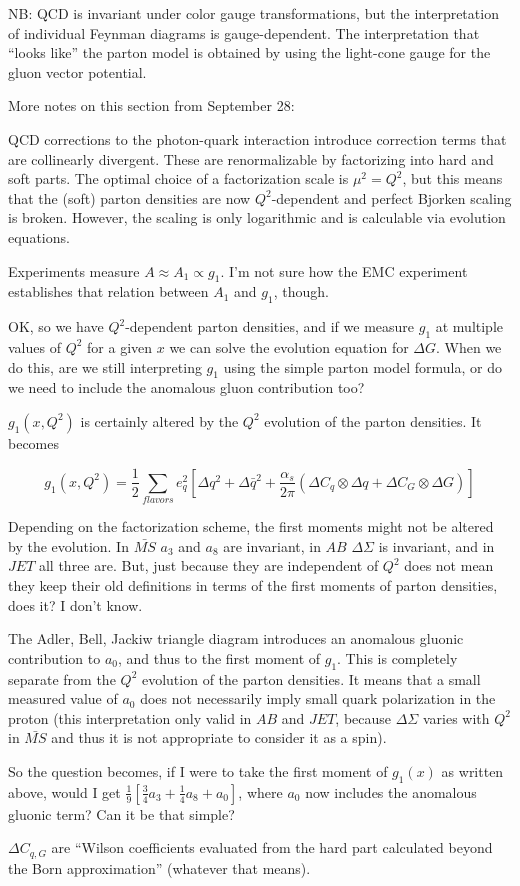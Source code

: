 NB: QCD is invariant under color gauge transformations, but the interpretation of individual Feynman diagrams is gauge-dependent.  The interpretation that ``looks like'' the parton model is obtained by using the light-cone gauge for the gluon vector potential.

More notes on this section from September 28:

QCD corrections to the photon-quark interaction introduce correction terms that are collinearly divergent.  These are renormalizable by factorizing into hard and soft parts.  The optimal choice of a factorization scale is $\mu^2 = Q^2$, but this means that the (soft) parton densities are now $Q^2$-dependent and perfect Bjorken scaling is broken.  However, the scaling is only logarithmic and is calculable via evolution equations.

Experiments measure $A \approx A_1 \propto g_1$.  I'm not sure how the EMC experiment establishes that relation between $A_1$ and $g_1$, though.

OK, so we have $Q^2$-dependent parton densities, and if we measure $g_1$ at multiple values of $Q^2$ for a given $x$ we can solve the evolution equation for $\Delta G$.  When we do this, are we still interpreting $g_1$ using the simple parton model formula, or do we need to include the anomalous gluon contribution too?

$g_1(x, Q^2)$ is certainly altered by the $Q^2$ evolution of the parton densities.  It becomes

\begin{equation}
  g_1(x, Q^2) = \frac{1}{2} \sum_{flavors} e_q^2 \left[\Delta q^2 + \Delta \bar{q}^2 + \frac{\alpha_s}{2 \pi} \left(\Delta C_q \otimes \Delta q + \Delta C_G \otimes \Delta G\right)\right]
\end{equation}

Depending on the factorization scheme, the first moments might not be altered by the evolution. In $\bar{MS}$ $a_3$ and $a_8$ are invariant, in $AB$ $\Delta \Sigma$ is invariant, and in $JET$ all three are.  But, just because they are independent of $Q^2$ does not mean they keep their old definitions in terms of the first moments of parton densities, does it?  I don't know.

The Adler, Bell, Jackiw triangle diagram introduces an anomalous gluonic contribution to $a_0$, and thus to the first moment of $g_1$.  This is completely separate from the $Q^2$ evolution of the parton densities.  It means that a small measured value of $a_0$ does not necessarily imply small quark polarization in the proton (this interpretation only valid in $AB$ and $JET$, because $\Delta \Sigma$ varies with $Q^2$ in $\bar{MS}$ and thus it is not appropriate to consider it as a spin).

So the question becomes, if I were to take the first moment of $g_1(x)$ as written above, would I get $\frac{1}{9}\left[\frac{3}{4}a_3+\frac{1}{4}a_8 + a_0\right]$, where $a_0$ now includes the anomalous gluonic term?  Can it be that simple?

$\Delta C_{q,G}$ are ``Wilson coefficients evaluated from the hard part calculated beyond the Born approximation'' (whatever that means).
